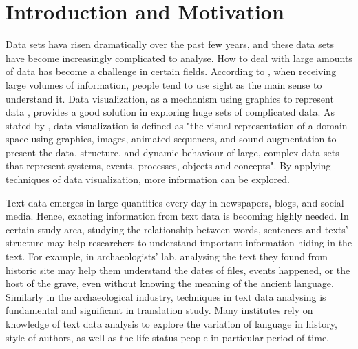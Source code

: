 
\section{Introduction and Motivation}

Data sets hava risen dramatically over the past few years, and these data sets have become increasingly complicated to analyse. How to deal with large amounts of data has become a challenge in certain fields\cite{Larameea}. According to \cite{Ward2015}, when receiving large volumes of information, people tend to use sight as the main sense to understand it. Data visualization, as a mechanism  using graphics to represent data \cite{Ward2015}, provides a good solution in exploring huge sets of complicated data.
As stated by \cite{Williams1995}, data visualization is defined as "the visual representation of a domain space using graphics, images, animated sequences, and sound augmentation to present the data, structure, and dynamic behaviour of large, complex data sets that represent systems, events, processes, objects and concepts"\cite{Williams1995}. By applying techniques of data visualization, more information can be explored.

Text data emerges in large quantities every day in newspapers, blogs, and social media. Hence, exacting information from text data is becoming highly needed. In certain study area, studying the relationship between words, sentences and texts’ structure may help researchers to understand important information hiding in the text. For example, in archaeologists’ lab, analysing the text they found from historic site may help them understand the dates of files, events happened, or the host of the grave, even without knowing the meaning of the ancient language. Similarly in the archaeological industry, techniques in text data analysing is fundamental and significant in translation study. Many institutes rely on knowledge of text data analysis to explore the variation of language in history, style of authors, as well as the life status people in particular period of time. 


